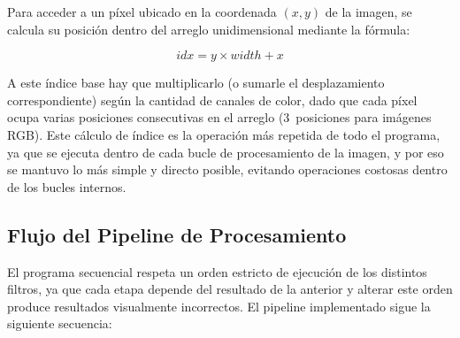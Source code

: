 Para acceder a un píxel ubicado en la coordenada $(x, y)$ de la imagen, se calcula su posición dentro del arreglo unidimensional mediante la fórmula:

\begin{equation}
\label{eq:idx}
idx = y \times \mathit{width} + x
\end{equation}

A este índice base hay que multiplicarlo (o sumarle el desplazamiento correspondiente) según la cantidad de canales de color, dado que cada píxel ocupa varias posiciones consecutivas en el arreglo (3~posiciones para imágenes RGB). Este cálculo de índice es la operación más repetida de todo el programa, ya que se ejecuta dentro de cada bucle de procesamiento de la imagen, y por eso se mantuvo lo más simple y directo posible, evitando operaciones costosas dentro de los bucles internos.


\subsection{Flujo del Pipeline de Procesamiento}

El programa secuencial respeta un orden estricto de ejecución de los distintos filtros, ya que cada etapa depende del resultado de la anterior y alterar este orden produce resultados visualmente incorrectos. El pipeline implementado sigue la siguiente secuencia:

